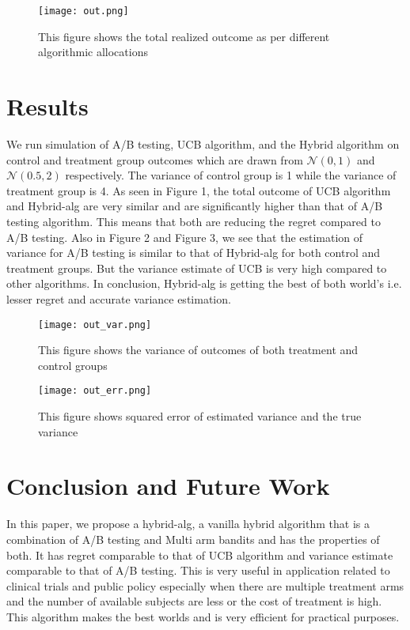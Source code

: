 \documentclass[letterpaper,11pt]{article}
\begin{document}
\begin{figure}
  \centering
    \texttt{[image: out.png]}
      \caption{This figure shows the total realized outcome as per different algorithmic allocations}
    
\end{figure}


\section{Results}

We run simulation of A/B testing, UCB algorithm, and the Hybrid algorithm on control and treatment group outcomes which are drawn from $\mathcal{N}(0,1)$ and $\mathcal{N}(0.5,2)$ respectively. The variance of control group is 1 while the variance of treatment group is 4. As seen in Figure 1, the total outcome of UCB algorithm and Hybrid-alg are very similar and are significantly higher than that of A/B testing algorithm. This means that both are reducing the regret compared to A/B testing. Also in Figure 2 and Figure 3, we see that the estimation of variance for A/B testing is similar to that of Hybrid-alg for both control and treatment groups. But the variance estimate of UCB is very high compared to other algorithms. In conclusion, Hybrid-alg is getting the best of both world's i.e. lesser regret and accurate variance estimation. 



\begin{figure}
  \centering
    \texttt{[image: out\_var.png]}
      \caption{This figure shows the variance of outcomes of both treatment and control groups}
    
\end{figure}


\begin{figure}
  \centering
    \texttt{[image: out\_err.png]}
      \caption{This figure shows squared error of estimated variance and the true variance}
    
\end{figure}



\section{Conclusion and Future Work}

In this paper, we propose a hybrid-alg, a vanilla hybrid algorithm that is a combination of A/B testing and Multi arm bandits and has the properties of both. It has regret comparable to that of UCB algorithm and variance estimate comparable to that of A/B testing. This is very useful in application related to clinical trials and public policy especially when there are multiple treatment arms and the number of available subjects are less or the cost of treatment is high. This algorithm makes the best worlds and is very efficient for practical purposes. \\
\end{document}
